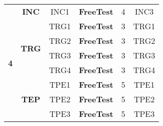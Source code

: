 \begin{table}[!ht]
{\begin{tabular}{|c|c|c|c|c|c|}
\multirow{9}{*}{\textbf{4}}                                                     & \textbf{INC}                  & INC1        & \textbf{FreeTest} & 4                                                                                  & INC3                                                                      \\ \cline{2-6} 
                                                                                & \multirow{4}{*}{\textbf{TRG}} & TRG1        & \textbf{FreeTest} & 3                                                                                  & TRG1                                                                      \\ \cline{3-6} 
                                                                                &                               & TRG2        & \textbf{FreeTest} & 3                                                                                  & TRG2                                                                      \\ \cline{3-6} 
                                                                                &                               & TRG3        & \textbf{FreeTest} & 3                                                                                  & TRG3                                                                      \\ \cline{3-6} 
                                                                                &                               & TRG4        & \textbf{FreeTest} & 3                                                                                  & TRG4                                                                      \\ \cline{2-6} 
                                                                                & \multirow{4}{*}{\textbf{TEP}} & TPE1        & \textbf{FreeTest} & 5                                                                                  & TPE1                                                                      \\ \cline{3-6} 
                                                                                &                               & TPE2        & \textbf{FreeTest} & 5                                                                                  & TPE2                                                                      \\ \cline{3-6} 
                                                                                &                               & TPE3        & \textbf{FreeTest} & 5                                                                                  & TPE3                                                                      \\ \cline{3-6} 

\end{tabular}}
\end{table}
